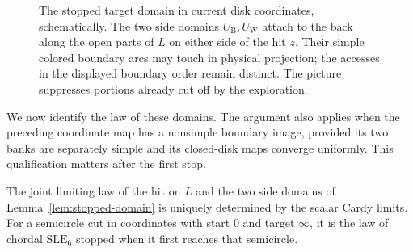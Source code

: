 \begin{figure}[tb]
\centering
{}
\caption{The stopped target domain in current disk coordinates,
schematically.  The two side domains $U_{\mathrm B},U_{\mathrm W}$
attach to the back along the open parts of $L$ on either side of the
hit $z$.  Their simple colored boundary arcs may touch in physical
projection; the accesses in the displayed boundary order remain
distinct.  The picture suppresses portions already cut off by the
exploration.}
\label{fig:stopped-domain}
\end{figure}

We now identify the law of these domains.  The argument also applies
when the preceding coordinate map has a nonsimple boundary image,
provided its two banks are separately simple and its closed-disk maps
converge uniformly.  This qualification matters after the first stop.

\begin{lemma}
\label{lem:stopped-kernel}
The joint limiting law of the hit on $L$ and the two side domains of
Lemma~\ref{lem:stopped-domain} is uniquely determined by the scalar
Cardy limits.  For a semicircle cut in coordinates with start $0$ and
target $\infty$, it is the law of chordal $\mathrm{SLE}_6$ stopped
when it first reaches that semicircle.
\end{lemma}

